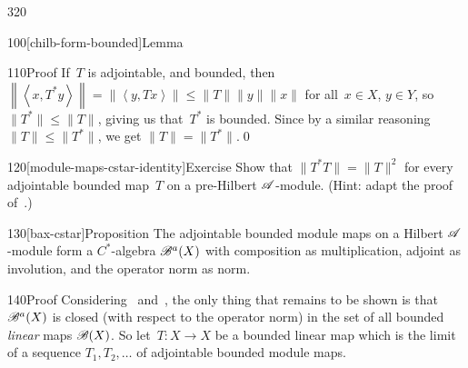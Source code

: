 \begin{parsec}{320}
\begin{point}{100}[chilb-form-bounded]{Lemma}
\begin{point}{110}{Proof}
If~$T$ is adjointable, and bounded,
then~$\left\|\left<x,T^*y\right>\right\|=\left\|\left<y,Tx\right>\right\|
\leq \|T\|\|y\|\|x\|$ for all~$x\in X$, $y\in Y$,
so~$\|T^*\|\leq \|T\|$,
giving us that~$T^*$ is bounded.
Since by a similar reasoning $\|T\|\leq \|T^*\|$,
we get $\|T\|=\|T^*\|$.\qed
\end{point}
\end{point}
\begin{point}{120}[module-maps-cstar-identity]{Exercise}%
Show that $\|T^*T\|=\|T\|^2$
for every adjointable bounded map~$T$ on a pre-Hilbert $\mathscr{A}$-module.
(Hint: adapt the proof of~.)
\end{point}
\begin{point}{130}[bax-cstar]{Proposition}%
The adjointable bounded module maps
on a Hilbert $\mathscr{A}$-module
form a $C^*$-algebra%
$\mathscr{B}^a(X)$
with composition as multiplication,
adjoint as involution,
and the operator norm as norm.
\begin{point}{140}{Proof}%
Considering~
and~,
the only thing that remains to be shown is that~$\mathscr{B}^a(X)$
is closed (with respect to the operator norm)
in the set of all bounded \emph{linear} maps $\mathscr{B}(X)$.
So let~$T\colon X\to X$ be a bounded linear map
which is the limit of a sequence $T_1,T_2,\dotsc$
of adjointable bounded module maps.


\end{point}
\end{point}
\end{parsec}
